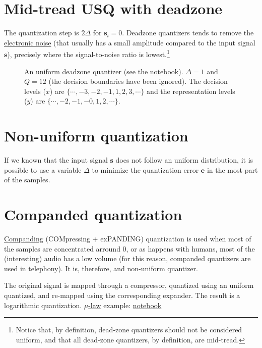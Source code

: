 \section{Mid-tread USQ with deadzone}

The quantization step is $2\Delta$ for ${\mathbf s}_i=0$. Deadzone
quantizers tends to remove the
\href{https://en.wikipedia.org/wiki/Noise_(electronics)}{electronic
  noise} (that usually has a small amplitude compared to the input
signal ${\mathbf s}$), precisely where the signal-to-noise ratio is
lowest.\footnote{Notice that, by definition, dead-zone quantizers
should not be considered uniform, and that all dead-zone quantizers,
by definition, are mid-tread.}

\begin{figure}
  \caption{An uniform deadzone quantizer (see the
    \href{https://nbviewer.jupyter.org/github/vicente-gonzalez-ruiz/quantization/blob/master/graphics/deadzone.ipynb}{notebook}). $\Delta=1$
    and $Q=12$ (the decision boundaries have been ignored). The
    decision levels ($x$) are $\{\cdots,-3,-2,-1,1,2,3,\cdots\}$
    and the representation levels ($y$) are
    $\{\cdots,-2,-1,-0,1,2,\cdots\}$.}
  \label{fig:deadzone}
\end{figure}

\section{Non-uniform quantization}
If we known that the input signal ${\mathbf s}$ does not follow an
uniform distribution, it is possible to use a variable $\Delta$ to
minimize the quantization error ${\mathbf e}$ in the most part of the
samples.


\section{Companded quantization~\cite{sayood2017introduction}}

\href{https://en.wikipedia.org/wiki/Companding}{Companding}
(COMpressing + exPANDING) quantization is used when most of the
samples are concentrated arround 0, or as happens with humans, most of
the (interesting) audio has a low volume (for this reason, companded
quantizers are used in telephony). It is, therefore, and non-uniform
quantizer.

The original signal is mapped through a compressor, quantized using an
uniform quantized, and re-mapped using the corresponding expander. The
result is a logarithmic quantization.
\href{https://en.wikipedia.org/wiki/\%CE\%9C-law_algorithm}{\(\mu\)-law}
example:
\href{https://nbviewer.jupyter.org/github/vicente-gonzalez-ruiz/quantization/blob/master/graphics/companded_quantization.ipynb}{notebook}

